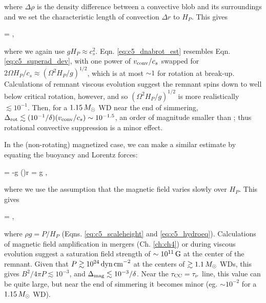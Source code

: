 \noindent where $\Delta \rho$ is the density difference between a convective blob and its surroundings and we set the characteristic length of convection $\Delta r$ to $H_P$.  This gives

\eqbegin
\dnabrot = ,
\label{eq:c5_dnabrot_est}
\eqend

\noindent where we again use $g H_P \approx c_s^2$.  Eqn. \ref{eq:c5_dnabrot_est} resembles Eqn. \ref{eq:c5_superad_dev}, with one power of $\vconv/c_s$ swapped for $2\Omega H_P/c_s \approx (\Omega^2 H_P/g)^{1/2}$, which is at most $\sim1$ for rotation at break-up.  Calculations of remnant viscous evolution \citep{shen+12, schw+12, ji+13} suggest the remnant spins down to well below critical rotation, however, and so $(\Omega^2 H_P/g)^{1/2}$ is more realistically $\lesssim10^{-1}$.  Then, for a $1.15\,\Msun$ WD near the end of simmering, $\dnabrot \lesssim (10^{-1}/\delta)(\vconv/c_s) \sim 10^{-1.5}$, an order of magnitude smaller than \nablaad; thus rotational convective suppression is a minor effect.  

In the (non-rotating) magnetized case, we can make a similar estimate by equating the buoyancy and Lorentz forces:

\eqbegin
{} = -g \left(\right)\Delta r = \rho g \delta \dnabmag,
\label{eq:c5_dnabmag_est_work}
\eqend

\noindent where we use the assumption that the magnetic field varies slowly over $H_P$.  This gives

\eqbegin
\dnabmag = ,
\label{eq:c5_dnabmag_est}
\eqend

\noindent where $\rho g = P/H_P$ (Eqns. \ref{eq:c5_scaleheight} and \ref{eq:c5_hydroeq}).  Calculations of magnetic field amplification in mergers (Ch. \ref{ch:ch4}) or during viscous evolution \citep{ji+13} suggest a saturation field strength of $\sim10^{11}\,\mathrm{G}$ at the center of the remnant.  Given that $P \gtrsim 10^{24}\,\mathrm{dyn\,cm}^{-2}$ at the centers of $\gtrsim 1.1\,\Msun$ WDs, this gives $B^2/4\pi P \lesssim 10^{-3}$, and $\dnabmag \lesssim 10^{-3}/\delta$.  Near the $\taucc = \taunu$ line, this value can be quite large, but near the end of simmering it becomes minor (eg. $\sim10^{-2}$ for a $1.15\,\Msun$ WD).

